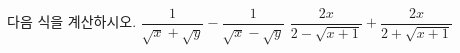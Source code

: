 다음 식을 계산하시오.
 $\dfrac{1}{\sqrt{x}+\sqrt{y}}-\dfrac{1}{\sqrt{x}-\sqrt{y}}$
 $\dfrac{2x}{2-\sqrt{x+1}}+\dfrac{2x}{2+\sqrt{x+1}}$
